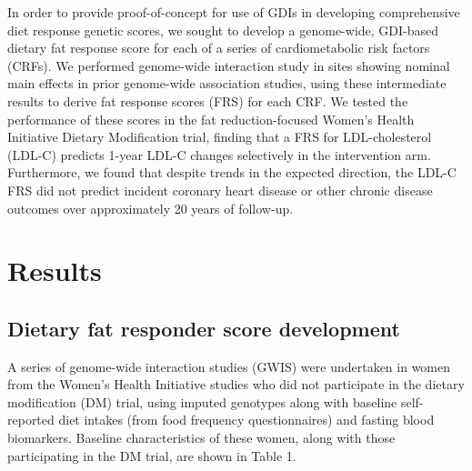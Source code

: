\documentclass[]{article}
\begin{document}
In order to provide proof-of-concept for use of GDIs in developing
comprehensive diet response genetic scores, we sought to develop a
genome-wide, GDI-based dietary fat response score for each of a series
of cardiometabolic risk factors (CRFs). We performed genome-wide
interaction study in sites showing nominal main effects in prior
genome-wide association studies, using these intermediate results to
derive fat response scores (FRS) for each CRF. We tested the performance
of these scores in the fat reduction-focused Women's Health Initiative
Dietary Modification trial, finding that a FRS for LDL-cholesterol
(LDL-C) predicts 1-year LDL-C changes selectively in the intervention
arm. Furthermore, we found that despite trends in the expected
direction, the LDL-C FRS did not predict incident coronary heart disease
or other chronic disease outcomes over approximately 20 years of
follow-up.

\hypertarget{results}{%
\section{Results}\label{results}}

\hypertarget{dietary-fat-responder-score-development}{%
\subsection{Dietary fat responder score
development}\label{dietary-fat-responder-score-development}}

A series of genome-wide interaction studies (GWIS) were undertaken in
women from the Women's Health Initiative studies who did not participate
in the dietary modification (DM) trial, using imputed genotypes along
with baseline self-reported diet intakes (from food frequency
questionnaires) and fasting blood biomarkers. Baseline characteristics
of these women, along with those participating in the DM trial, are
shown in Table 1.
\end{document}
